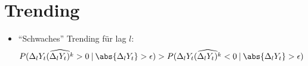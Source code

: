 \documentclass{article}
\theoremstyle{plain}%
\theoremstyle{definition}
\newcommand{\lag}[1][l]{\Delta_{#1}}
\DeclarePairedDelimiter{\abs}\lvert\rvert
\begin{document}
\section{Trending}

\begin{itemize}
  \item \enquote{Schwaches} Trending für lag $l$:
   \begin{equation}
  	P(\lag Y_t \widehat{(\lag Y_t)^k} > 0 \:\lvert\: \abs{\lag Y_t} > \epsilon) > P(\lag Y_t \widehat{(\lag Y_t)^k} < 0 \:\lvert\: \abs{\lag Y_t} > \epsilon)
   \end{equation}

\end{itemize}




\end{document}
